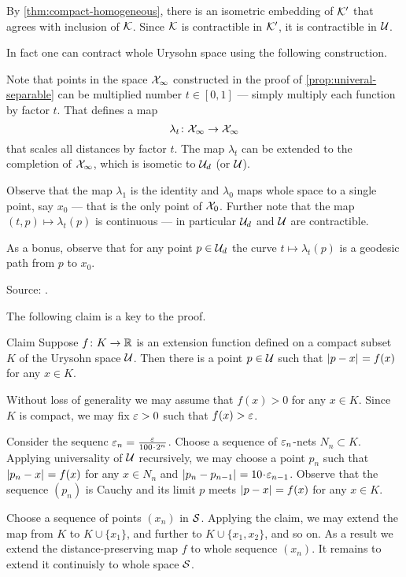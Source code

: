 By \ref{thm:compact-homogeneous}, there is an isometric embedding of $\mathcal{K}'$ that agrees with inclusion of $\mathcal{K}$.
Since $\mathcal{K}$ is contractible in $\mathcal{K}'$, it is contractible in $\mathcal{U}$.

\medskip

In fact one can contract whole Urysohn space using the following construction.

Note that points in the space $\mathcal{X}_\infty$ constructed in the proof of \ref{prop:univeral-separable} can be multiplied number $t\in [0,1]$ --- simply multiply each function by factor $t$.
That defines a map 
\[\lambda_t\colon\mathcal{X}_\infty\to \mathcal{X}_\infty\]
that scales all distances by factor $t$.
The map $\lambda_t$ can be extended to the completion of $\mathcal{X}_\infty$, which is isometic to $\mathcal{U}_d$ (or $\mathcal{U}$).

Observe that 
the map $\lambda_1$ is the identity  and $\lambda_0$ maps whole space to a single point, say $x_0$ --- that is the only point of $\mathcal{X}_0$.
Further note that the map $(t,p)\mapsto \lambda_t(p)$ is continuous ---  in particular $\mathcal{U}_d$ and $\mathcal{U}$ are contractible.

As a bonus, observe that for any point $p\in \mathcal{U}_d$ the curve $t\mapsto \lambda_t(p)$ is a geodesic path from $p$ to $x_0$.

Source: \cite[(d) on page 82]{gromov-2007}.


The following claim is a key to the proof.

\begin{thm}{Claim}
Suppose $f\colon K\to\mathbb{R}$ is an extension function defined on a compact subset $K$ of the Urysohn space $\mathcal{U}$.
Then there is a point $p\in \mathcal{U}$ such that 
$\dist{p}{x}{}=f(x)$ for any $x\in K$.
\end{thm}

Without loss of generality we may assume that $f(x)>0$ for any $x\in K$.
Since $K$ is compact, we may fix $\varepsilon>0$ such that $f(x)>\varepsilon$.

Consider the sequenc $\eps_n=\tfrac\eps{100\cdot 2^n}$.
Choose a sequence of $\varepsilon_n$-nets $N_n\subset K$.
Applying universality of $\mathcal{U}$ recursively, we may choose a point $p_n$ such that $\dist{p_n}{x}{}=f(x)$ for any $x\in N_n$ and $\dist{p_n}{p_{n-1}}{}\z=10\cdot\eps_{n-1}$.
Observe that the sequence $(p_n)$ is Cauchy and its limit $p$ meets 
$\dist{p}{x}{}=f(x)$ for any $x\in K$.
\qeds

Choose a sequence of points $(x_n)$ in $\mathcal{S}$.
Applying the claim, we may extend the map from $K$ to $K\cup\{x_1\}$, and further to $K\cup\{x_1,x_2\}$, and so on.
As a result we extend the distance-preserving map $f$ to whole sequence $(x_n)$.
It remains to extend it continuisly to whole space $\mathcal{S}$.

